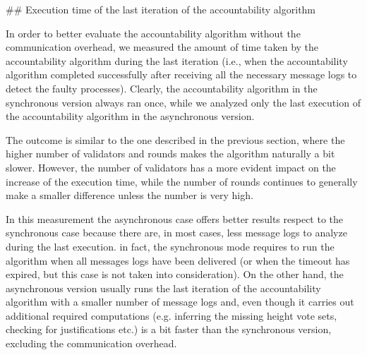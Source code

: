 \documentclass[a4paper,11pt,oneside]{report}
\begin{document}
\begin{markdown}

## Execution time of the last iteration of the accountability algorithm

In order to better evaluate the accountability algorithm without the communication overhead, we measured the amount of time taken by the accountability algorithm during the last iteration (i.e., when the accountability algorithm completed successfully after receiving all the necessary message logs to detect the faulty processes).
Clearly, the accountability algorithm in the synchronous version always ran once, while we analyzed only the last execution of the accountability algorithm in the asynchronous version.

The outcome is similar to the one described in the previous section, where the higher number of validators and rounds makes the algorithm naturally a bit slower.
However, the number of validators has a more evident impact on the increase of the execution time, while the number of rounds continues to generally make a smaller difference unless the number is very high.

In this measurement the asynchronous case offers better results respect to the synchronous case because there are, in most cases, less message logs to analyze during the last execution.
in fact, the synchronous mode requires to run the algorithm when all messages logs have been delivered (or when the timeout has expired, but this case is not taken into consideration). 
On the other hand, the asynchronous version usually runs the last iteration of the accountability algorithm with a smaller number of message logs and, even though it carries out additional required computations (e.g. inferring the missing height vote sets, checking for justifications etc.) is a bit faster than the synchronous version, excluding the communication overhead.

\end{markdown}
\end{document}
